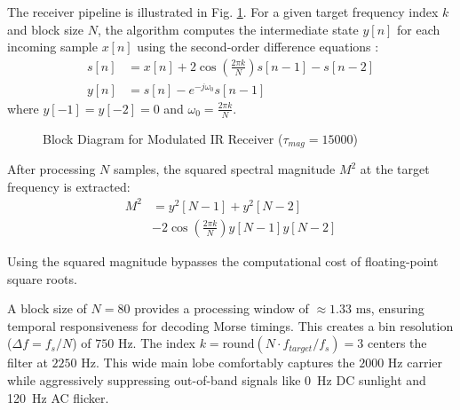 \documentclass[conference]{IEEEtran}
\begin{document}
The receiver pipeline is illustrated in Fig. \ref{fig:modulated_block}. For a given target frequency index $k$ and block size $N$, the algorithm computes the intermediate state $y[n]$ for each incoming sample $x[n]$ using the second-order difference equations \cite{goertzel}:
\begin{align}
    s[n] &= x[n] + 2 \cos\left(\frac{2\pi k}{N}\right) s[n-1] - s[n-2] \\
    y[n] &= s[n] - e^{-j\omega_{0}} s[n-1]
\end{align}
where $y[-1] = y[-2] = 0$ and $\omega_0 = \frac{2\pi k}{N}$.

\begin{figure}[htbp]
\centering
{}
\caption{Block Diagram for Modulated IR Receiver ($\tau_{mag} = 15000$)}
\label{fig:modulated_block}
\end{figure}

After processing $N$ samples, the squared spectral magnitude $M^2$ at the target frequency is extracted:
\begin{align}
    M^2 &= y^2[N-1] + y^2[N-2] \\ 
	&- 2 \cos\left(\frac{2\pi k}{N}\right) y[N-1] y[N-2]
\end{align}

Using the squared magnitude bypasses the computational cost of floating-point square roots. 

A block size of $N=80$ provides a processing window of $\approx 1.33\text{ ms}$, ensuring temporal responsiveness for decoding Morse timings. This creates a bin resolution ($\Delta f = f_s / N$) of $750\text{ Hz}$. The index $k = \text{round}(N \cdot f_{target} / f_s) = 3$ centers the filter at $2250\text{ Hz}$. This wide main lobe comfortably captures the $2000\text{ Hz}$ carrier while aggressively suppressing out-of-band signals like 0~Hz DC sunlight and 120~Hz AC flicker.
\end{document}
